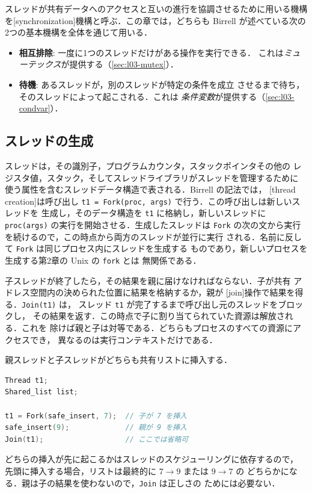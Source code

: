 \documentclass[../main.tex]{subfiles}
\begin{document}
スレッドが共有データへのアクセスと互いの進行を協調させるために用いる機構
を[synchronization]機構と呼ぶ．この章では，どちらも
Birrell が述べている次の2つの基本機構を全体を通じて用いる．
\begin{itemize}
  \item \textbf{相互排除}: 一度に1つのスレッドだけがある操作を実行できる．
    これは\emph{ミューテックス}が提供する（\cref{sec:l03-mutex}）．
  \item \textbf{待機}: あるスレッドが，別のスレッドが特定の条件を成立
    させるまで待ち，そのスレッドによって起こされる．これは
    \emph{条件変数}が提供する（\cref{sec:l03-condvar}）．
\end{itemize}

\subsection{スレッドの生成}
\label{sec:l03-creation}

スレッドは，その識別子，プログラムカウンタ，スタックポインタその他の
レジスタ値，スタック，そしてスレッドライブラリがスレッドを管理するために
使う属性を含むスレッドデータ構造で表される．Birrell の記法では，
[thread creation]は呼び出し
\texttt{t1 = Fork(proc, args)} で行う．この呼び出しは新しいスレッドを
生成し，そのデータ構造を \texttt{t1} に格納し，新しいスレッドに
\texttt{proc(args)} の実行を開始させる．生成したスレッドは \texttt{Fork}
の次の文から実行を続けるので，この時点から両方のスレッドが並行に実行
される．名前に反して \texttt{Fork} は同じプロセス内にスレッドを生成する
ものであり，新しいプロセスを生成する第2章の Unix の \texttt{fork} とは
無関係である．

子スレッドが終了したら，その結果を親に届けなければならない．子が共有
アドレス空間内の決められた位置に結果を格納するか，親が
[join]操作で結果を得る．\texttt{Join(t1)} は，
スレッド \texttt{t1} が完了するまで呼び出し元のスレッドをブロックし，
その結果を返す．この時点で子に割り当てられていた資源は解放される．これを
除けば親と子は対等である．どちらもプロセスのすべての資源にアクセスでき，
異なるのは実行コンテキストだけである．

\begin{example}
  親スレッドと子スレッドがどちらも共有リストに挿入する．
  \begin{lstlisting}[language=C, numbers=none]
Thread t1;
Shared_list list;

t1 = Fork(safe_insert, 7);  // 子が 7 を挿入
safe_insert(9);             // 親が 9 を挿入
Join(t1);                   // ここでは省略可
\end{lstlisting}
  どちらの挿入が先に起こるかはスレッドのスケジューリングに依存するので，
  先頭に挿入する場合，リストは最終的に $7\to 9$ または $9\to 7$ の
  どちらかになる．親は子の結果を使わないので，\texttt{Join} は正しさの
  ためには必要ない．
\end{example}
\end{document}
